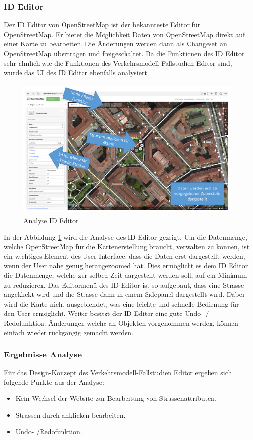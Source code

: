 \subsubsection{ID Editor}
Der ID Editor von OpenStreetMap ist der bekannteste Editor für OpenStreetMap. Er bietet die Möglichkeit Daten von OpenStreetMap direkt auf einer Karte zu bearbeiten. Die Änderungen werden dann als Changeset an OpenStreetMap übertragen und freigeschaltet. Da die Funktionen des ID Editor sehr ähnlich wie die Funktionen des Verkehrsmodell-Fallstudien Editor sind, wurde das UI des ID Editor ebenfalls analysiert.
\begin{figure}[H]
\centering
\includegraphics[height=7cm]{images/AnalyseIDEditor.png}
\caption{Analyse ID Editor}
\label{fig:ideditor}
\end{figure}
\noindent
In der Abbildung \ref{fig:ideditor}  wird die Analyse des ID Editor gezeigt. Um die Datenmenge, welche OpenStreetMap für die Kartenerstellung braucht, verwalten zu können, ist ein wichtiges Element des User Interface, dass die Daten erst dargestellt werden, wenn der User nahe genug herangezoomed hat. Dies ermöglicht es dem ID Editor die Datenmenge, welche zur selben Zeit dargestellt werden soll, auf ein Minimum zu reduzieren. Das Editormenü des ID Editor ist so aufgebaut, dass eine Strasse angeklickt wird und die Strasse dann in einem Sidepanel dargestellt wird. Dabei wird die Karte nicht ausgeblendet, was eine leichte und schnelle Bedienung für den User ermöglicht. Weiter besitzt der ID Editor eine gute Undo- / Redofunktion. Änderungen welche an Objekten vorgenommen werden, können einfach wieder rückgängig gemacht werden.
\subsubsection*{Ergebnisse Analyse}
Für das Design-Konzept des Verkehrsmodell-Fallstudien Editor ergeben sich folgende Punkte aus der Analyse:
\begin{itemize}
\item Kein Wechsel der Website zur Bearbeitung von Strassenattributen.
\item Strassen durch anklicken bearbeiten.
\item Undo- /Redofunktion.
\end{itemize}
\newpage

